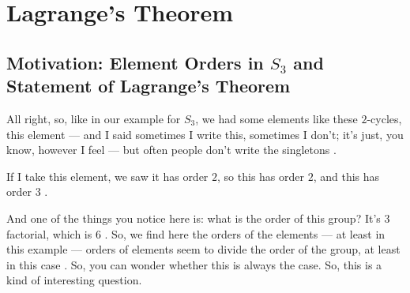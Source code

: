 \begin{hidden}
\end{hidden}

\section{Lagrange's Theorem}

\subsection{Motivation: Element Orders in \texorpdfstring{$S_3$}{S3} and Statement of Lagrange's Theorem}

\begin{speech}[00:07:55 - 00:08:57]
All right, so, like in our example for $S_3$, we had some elements like these $2$-cycles, this element --- and I said sometimes I write this, sometimes I don't; it's just, you know, however I feel --- but often people don't write the singletons .

If I take this element, we saw it has order $2$, so this has order $2$, and this has order $3$ .

And one of the things you notice here is: what is the order of this group? It's $3$ factorial, which is $6$ . So, we find here the orders of the elements --- at least in this example --- orders of elements seem to divide the order of the group, at least in this case . So, you can wonder whether this is always the case. So, this is a kind of interesting question.
\end{speech}

\begin{content}
\end{content}

